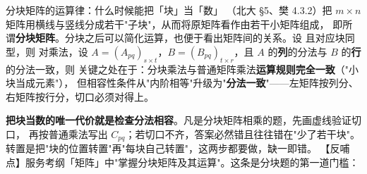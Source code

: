 
\begin{fdeep}{分块矩阵的运算律：什么时候能把「块」当「数」}
（北大 §5、樊 4.3.2）把 $m\times n$ 矩阵用横线与竖线分成若干"子块"，从而将原矩阵看作由若干小矩阵组成，
即所谓\textbf{分块矩阵}。分块之后可以简化运算，也便于看出矩阵间的关系。设
且对应块同型，则
对乘法，设 $A=(A_{pq})_{s\times t}$，$B=(B_{pq})_{t\times r}$，且 $A$ 的\textbf{列}的分法与 $B$ 的\textbf{行}的分法一致，则
关键之处在于：分块乘法与普通矩阵乘法\textbf{运算规则完全一致}（"小块当成元素"），
但相容性条件从"内阶相等"升级为"\textbf{分法一致}"——左矩阵按列分、右矩阵按行分，切口必须对得上。

\textbf{把块当数的唯一代价就是检查分法相容}。凡是分块矩阵相乘的题，先画虚线验证切口，
再按普通乘法写出 $C_{pq}$；若切口不齐，答案必然错且往往错在"少了若干块"。
转置是把"块的位置转置"再"每块自己转置"，这两步都要做，缺一即错。
【反哺点】服务考纲「矩阵」中"掌握分块矩阵及其运算"。这条是分块题的第一道门槛：
\end{fdeep}

